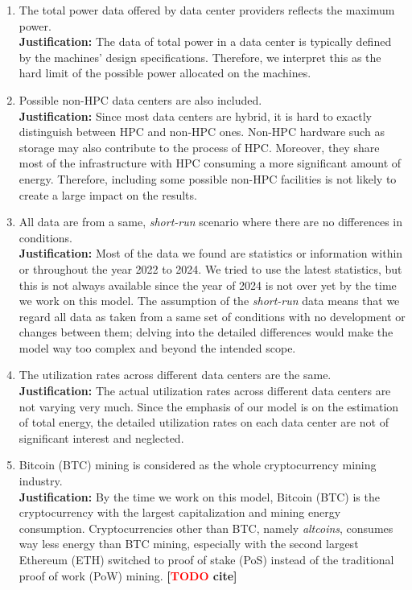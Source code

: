 \documentclass[12pt]{article}
\newcommand{\todo}[1]{\textbf{[\textcolor{red}{TODO} #1]}}
\begin{document}
\begin{enumerate}
	\item The total power data offered by data center providers reflects the maximum power. \\
	\textbf{Justification:} The data of total power in a data center is typically defined by the machines' design specifications. Therefore, we interpret this as the hard limit of the possible power allocated on the machines.
	
	\item Possible non-HPC data centers are also included. \\
	\textbf{Justification:} Since most data centers are hybrid, it is hard to exactly distinguish between HPC and non-HPC ones. Non-HPC hardware such as storage may also contribute to the process of HPC. Moreover, they share most of the infrastructure with HPC consuming a more significant amount of energy. Therefore, including some possible non-HPC facilities is not likely to create a large impact on the results.
	
	\item All data are from a same, \textit{short-run} scenario where there are no differences in conditions. \\
	\textbf{Justification:} Most of the data we found are statistics or information within or throughout the year 2022 to 2024. We tried to use the latest statistics, but this is not always available since the year of 2024 is not over yet by the time we work on this model. The assumption of the \textit{short-run} data means that we regard all data as taken from a same set of conditions with no development or changes between them; delving into the detailed differences would make the model way too complex and beyond the intended scope.

	\item The utilization rates across different data centers are the same. \\
	\textbf{Justification:} The actual utilization rates across different data centers are not varying very much. Since the emphasis of our model is on the estimation of total energy, the detailed utilization rates on each data center are not of significant interest and neglected.

	\item Bitcoin (BTC) mining is considered as the whole cryptocurrency mining industry. \\
	\textbf{Justification:} By the time we work on this model, Bitcoin (BTC) is the cryptocurrency with the largest capitalization and mining energy consumption. Cryptocurrencies other than BTC, namely \textit{altcoins}, consumes way less energy than BTC mining, especially with the second largest Ethereum (ETH) switched to proof of stake (PoS) instead of the traditional proof of work (PoW) mining. \todo{cite}


\end{enumerate}
\end{document}
